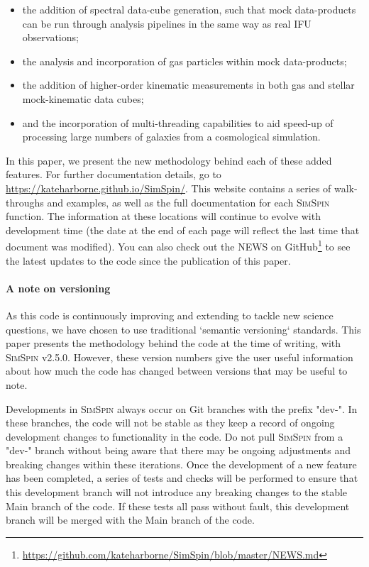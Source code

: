 \documentclass[
  journal=pasa,
  manuscript=research-paper, %
  year=2020,
  volume=37,
]{cup-journal}
\newcommand{\simspin}[1]{\textsc{SimSpin}#1} %
\newcommand{\ssversion}[1]{v2.5.0#1}
\begin{document}
\begin{itemize}
    \item the addition of spectral data-cube generation, such that mock data-products can be run through analysis pipelines in the same way as real IFU observations;
    \item the analysis and incorporation of gas particles within mock data-products;  
    \item the addition of higher-order kinematic measurements in both gas and stellar mock-kinematic data cubes;
    \item and the incorporation of multi-threading capabilities to aid speed-up of processing large numbers of galaxies from a cosmological simulation. 
\end{itemize}

In this paper, we present the new methodology behind each of these added features. 
For further documentation details, go to \url{https://kateharborne.github.io/SimSpin/}. 
This website contains a series of walk-throughs and examples, as well as the full documentation for each \simspin{} function. 
The information at these locations will continue to evolve with development time (the date at the end of each page will reflect the last time that document was modified).
You can also check out the NEWS on GitHub\footnote{\url{https://github.com/kateharborne/SimSpin/blob/master/NEWS.md}} to see the latest updates to the code since the publication of this paper. 

\paragraph{A note on versioning \\} 

As this code is continuously improving and extending to tackle new science questions, we have chosen to use traditional `semantic versioning` standards. 
This paper presents the methodology behind the code at the time of writing, with \simspin{} \ssversion. 
However, these version numbers give the user useful information about how much the code has changed between versions that may be useful to note. 

Developments in \simspin{} always occur on Git branches with the prefix "dev-". 
In these branches, the code will not be stable as they keep a record of ongoing development changes to functionality in the code. 
Do not pull \simspin{} from a "dev-" branch without being aware that there may be ongoing adjustments and breaking changes within these iterations.
Once the development of a new feature has been completed, a series of tests and checks will be performed to ensure that this development branch will not introduce any breaking changes to the stable Main branch of the code. 
If these tests all pass without fault, this development branch will be merged with the Main branch of the code. 
\end{document}
